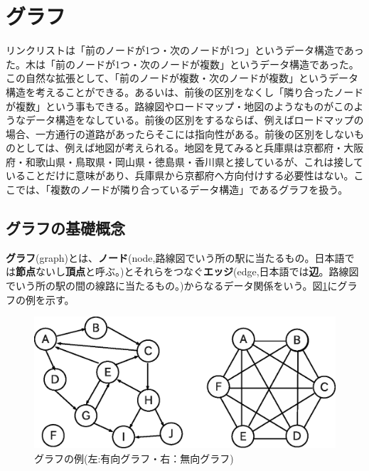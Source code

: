 \section{グラフ}
リンクリストは「前のノードが1つ・次のノードが1つ」というデータ構造であった。木は「前のノードが1つ・次のノードが複数」というデータ構造であった。この自然な拡張として、「前のノードが複数・次のノードが複数」というデータ構造を考えることができる。あるいは、前後の区別をなくし「隣り合ったノードが複数」という事もできる。路線図やロードマップ・地図のようなものがこのようなデータ構造をなしている。前後の区別をするならば、例えばロードマップの場合、一方通行の道路があったらそこには指向性がある。前後の区別をしないものとしては、例えば地図が考えられる。地図を見てみると兵庫県は京都府・大阪府・和歌山県・鳥取県・岡山県・徳島県・香川県と接しているが、これは接していることだけに意味があり、兵庫県から京都府へ方向付けする必要性はない。ここでは、「複数のノードが隣り合っているデータ構造」であるグラフを扱う。

\subsection{グラフの基礎概念}
\textbf{グラフ}(graph)とは、\textbf{ノード}(node,路線図でいう所の駅に当たるもの。日本語では\textbf{節点}ないし\textbf{頂点}と呼ぶ。)とそれらをつなぐ\textbf{エッジ}(edge,日本語では\textbf{辺}。路線図でいう所の駅の間の線路に当たるもの。)からなるデータ関係をいう。図\ref{graph}にグラフの例を示す。

\begin{figure}[htb]
\centering
\includegraphics[width=0.9\linewidth,keepaspectratio]{fig13_5.eps}
\caption{グラフの例(左:有向グラフ・右：無向グラフ)}\label{graph}
\end{figure}

